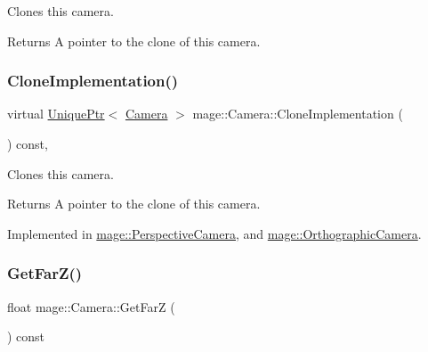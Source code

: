 Clones this camera.

\begin{DoxyReturn}{Returns}
A pointer to the clone of this camera. 
\end{DoxyReturn}
\hypertarget{classmage_1_1_camera_aedf6e7d6ee6c6e9e82da814ef8e705ab}{}\label{classmage_1_1_camera_aedf6e7d6ee6c6e9e82da814ef8e705ab} 
\subsubsection{\texorpdfstring{Clone\+Implementation()}{CloneImplementation()}}
{\footnotesize\ttfamily virtual \hyperlink{namespacemage_a3316d7143a973e37adf1110f2e80ca31}{Unique\+Ptr}$<$ \hyperlink{classmage_1_1_camera}{Camera} $>$ mage\+::\+Camera\+::\+Clone\+Implementation (\begin{DoxyParamCaption}{ }\end{DoxyParamCaption}) const\hspace{0.3cm}{\ttfamily [private]}, {}}

Clones this camera.

\begin{DoxyReturn}{Returns}
A pointer to the clone of this camera. 
\end{DoxyReturn}


Implemented in \hyperlink{classmage_1_1_perspective_camera_aa597ab884256b7e6fad63653af3ac789}{mage\+::\+Perspective\+Camera}, and \hyperlink{classmage_1_1_orthographic_camera_aeef89cff8f4272b1412fa3ce366e656d}{mage\+::\+Orthographic\+Camera}.

\hypertarget{classmage_1_1_camera_ac4c8e8bbfb16068ab24a90e4a4788d15}{}\label{classmage_1_1_camera_ac4c8e8bbfb16068ab24a90e4a4788d15} 
\subsubsection{\texorpdfstring{Get\+Far\+Z()}{GetFarZ()}}
{\footnotesize\ttfamily float mage\+::\+Camera\+::\+Get\+FarZ (\begin{DoxyParamCaption}{ }\end{DoxyParamCaption}) const\hspace{0.3cm}{\ttfamily [noexcept]}}

